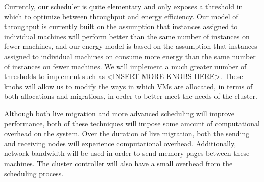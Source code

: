 Currently, our scheduler is quite elementary and only exposes a threshold in which to optimize between throughput and energy efficiency.  Our model of throughput is currently built on the assumption that instances assigned to individual machines will perform better than the same number of instances on fewer machines, and our energy model is based on the assumption that instances assigned to individual machines on consume more energy than the same number of instances on fewer machines.  We will implement a much greater number of thresholds to implement such as <INSERT MORE KNOBS HERE>.  These knobs will allow us to modify the ways in which VMs are allocated, in terms of both allocations and migrations, in order to better meet the needs of the cluster.

Although both live migration and more advanced scheduling will improve performance, both of these techniques will impose some amount of computational overhead on the system.  Over the duration of live migration, both the sending and receiving nodes will experience computational overhead.  Additionally, network bandwidth will be used in order to send memory pages between these machines.  The cluster controller will also have a small overhead from the scheduling process.  